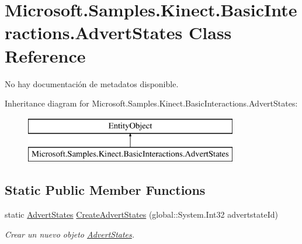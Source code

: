 \hypertarget{class_microsoft_1_1_samples_1_1_kinect_1_1_basic_interactions_1_1_advert_states}{\section{Microsoft.\-Samples.\-Kinect.\-Basic\-Interactions.\-Advert\-States Class Reference}
\label{class_microsoft_1_1_samples_1_1_kinect_1_1_basic_interactions_1_1_advert_states}
}


No hay documentación de metadatos disponible.  


Inheritance diagram for Microsoft.\-Samples.\-Kinect.\-Basic\-Interactions.\-Advert\-States\-:\begin{figure}[H]
\begin{center}
\leavevmode
\includegraphics[height=2.000000cm]{class_microsoft_1_1_samples_1_1_kinect_1_1_basic_interactions_1_1_advert_states}
\end{center}
\end{figure}
\subsection*{Static Public Member Functions}
\begin{DoxyCompactItemize}
\item 
static \hyperlink{class_microsoft_1_1_samples_1_1_kinect_1_1_basic_interactions_1_1_advert_states}{Advert\-States} \hyperlink{class_microsoft_1_1_samples_1_1_kinect_1_1_basic_interactions_1_1_advert_states_a1ab242f92057b7b15afa9b173b7a390d}{Create\-Advert\-States} (global\-::\-System.\-Int32 advertstate\-Id)
\begin{DoxyCompactList}\small\item\em Crear un nuevo objeto \hyperlink{class_microsoft_1_1_samples_1_1_kinect_1_1_basic_interactions_1_1_advert_states}{Advert\-States}. \end{DoxyCompactList}\end{DoxyCompactItemize}
